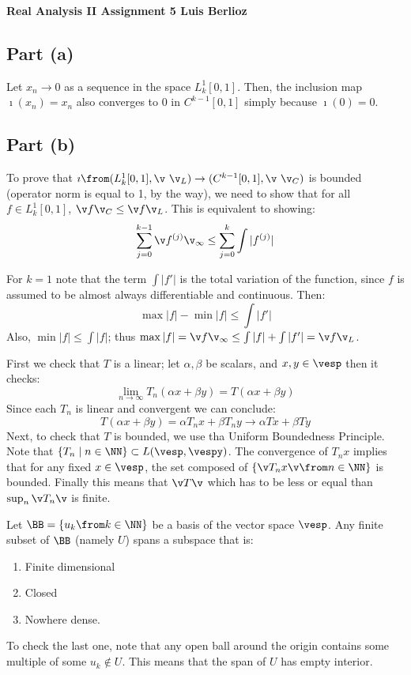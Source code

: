 \noindent\textbf{Real Analysis II Assignment 5 \hspace{\fill} Luis Berlioz}
\subsection*{Part (a)}
Let $x_n \to 0$ as a sequence in the space $L_k^1[0,1]$.
Then, the inclusion map $\imath(x_n)=x_n$ also converges to $0$ in $C^{k-1}[0,1]$ simply because $\imath(0)=0$.

\subsection*{Part (b)}
To prove that $\imath \from (L_k^1[0,1],\v \ \v_L) \to (C^{k-1}[0,1],\v\ \v_C)$ is bounded (operator norm is equal to 1, by the way), we need to show that for all $f\in L_k^1[0,1]$,  $\v f \v_C \leq \v f\v_L$. This is equivalent to showing:
$$\sum_{j=0}^{k-1} \v f^{(j)}\v_\infty \leq \sum_{j=0}^{k}\int | f^{(j)}|$$

For $k=1$ note that the term $\int |f'|$ is the total variation of the function, since $f$ is assumed to be almost always differentiable and continuous. Then:
$$\max|f| - \min |f| \leq \int |f'|$$
Also, $\min|f|\leq \int |f|$; thus $\max |f| = \v f\v_\infty \leq \int |f| + \int |f'|=\v f\v_L$.


First we check that $T$ is a linear; let $\alpha,\beta$ be scalars, and $x,y\in \vesp$ then it checks:
$$\lim_{n\to \infty} T_n(\alpha x+\beta y) = T(\alpha x+\beta y)$$
Since each $T_n$ is linear and convergent we can conclude:
$$T(\alpha x+\beta y)=\alpha T_nx +\beta T_n y \to \alpha Tx + \beta Ty$$
Next, to check that $T$ is bounded, we use tha Uniform Boundedness Principle.
Note that $\{T_n \mid n\in\NN \} \subset L(\vesp, \vespy)$. 
The convergence of $T_nx$ implies that for any fixed  $x\in \vesp$, the set composed of $\{\v T_n x\v \from n\in \NN\}$ is bounded.
Finally this means that $\v T\v$ which has to be less or equal than $\sup_{n}\v T_n\v$ is finite.

Let $\BB=\{u_k\from k\in \NN\}$ be a basis of the vector space $\vesp$.
Any finite subset of $\BB$ (namely $U$) spans a subspace that is:
\begin{enumerate}
    \item Finite dimensional 
    \item Closed 
    \item Nowhere dense. 
\end{enumerate}
To check the last one, note that any open ball around the origin contains some multiple of some $u_k \notin U$.
This means that the span of $U$ has empty interior.

